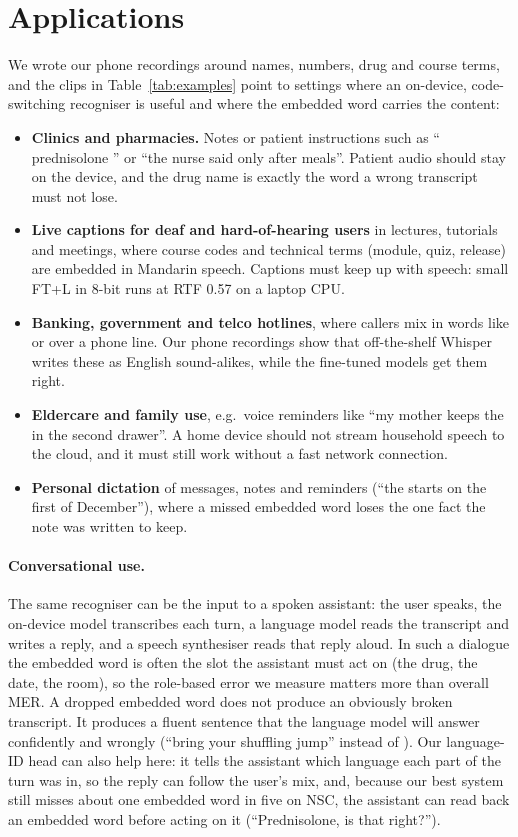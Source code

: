 \section{Applications}
\label{sec:apps}

We wrote our phone recordings around names, numbers, drug and course terms, and the clips in Table~\ref{tab:examples} point to settings where an on-device, code-switching recogniser is useful and where the embedded word carries the content:
\begin{itemize}
  \item \textbf{Clinics and pharmacies.} Notes or patient instructions such as `` prednisolone '' or ``the nurse said  only after meals''. Patient audio should stay on the device, and the drug name is exactly the word a wrong transcript must not lose.
  \item \textbf{Live captions for deaf and hard-of-hearing users} in lectures, tutorials and meetings, where course codes and technical terms (module, quiz, release) are embedded in Mandarin speech. Captions must keep up with speech: small FT+L in 8-bit runs at RTF 0.57 on a laptop CPU.
  \item \textbf{Banking, government and telco hotlines}, where callers mix in words like  or  over a phone line. Our phone recordings show that off-the-shelf Whisper writes these as English sound-alikes, while the fine-tuned models get them right.
  \item \textbf{Eldercare and family use}, e.g.\ voice reminders like ``my mother keeps the  in the second drawer''. A home device should not stream household speech to the cloud, and it must still work without a fast network connection.
  \item \textbf{Personal dictation} of messages, notes and reminders (``the  starts on the first of December''), where a missed embedded word loses the one fact the note was written to keep.
\end{itemize}

\paragraph{Conversational use.} The same recogniser can be the input to a spoken assistant: the user speaks, the on-device model transcribes each turn, a language model reads the transcript and writes a reply, and a speech synthesiser reads that reply aloud. In such a dialogue the embedded word is often the slot the assistant must act on (the drug, the date, the room), so the role-based error we measure matters more than overall MER. A dropped embedded word does not produce an obviously broken transcript. It produces a fluent sentence that the language model will answer confidently and wrongly (``bring your shuffling jump'' instead of ). Our language-ID head can also help here: it tells the assistant which language each part of the turn was in, so the reply can follow the user's mix, and, because our best system still misses about one embedded word in five on NSC, the assistant can read back an embedded word before acting on it (``Prednisolone, is that right?'').

